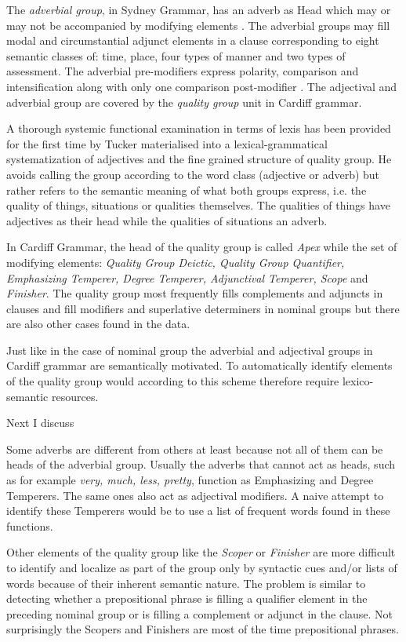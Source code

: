 	The \textit{adverbial group}, in Sydney Grammar, has an adverb as Head which may or may not be accompanied by modifying elements \citep[419]{Halliday2013}. The adverbial groups may fill modal and circumstantial adjunct elements in a clause corresponding to eight semantic classes of: time, place, four types of manner and two types of assessment. The adverbial pre-modifiers express polarity, comparison and intensification along with only one comparison post-modifier \citep[420--421]{Halliday2013}. The adjectival and adverbial group are covered by the \textit{quality group} unit in Cardiff grammar.
    
	A thorough systemic functional examination in terms of lexis has been provided for the first time by Tucker \citet{Tucker1997,Tucker1998} materialised into a lexical-grammatical systematization of adjectives and the fine grained structure of quality group. He avoids calling the group according to the word class (adjective or adverb) but rather refers to the semantic meaning of what both groups express, i.e. the quality of things, situations or qualities themselves. The qualities of things have adjectives as their head while the qualities of situations an adverb.       
	
	In Cardiff Grammar, the head of the quality group is called \textit{Apex} while the set of modifying elements: \textit{Quality Group Deictic, Quality Group Quantifier, Emphasizing Temperer, Degree Temperer, Adjunctival Temperer, Scope} and \textit{Finisher}. The quality group most frequently fills complements and adjuncts in clauses and fill modifiers and superlative determiners in nominal groups but there are also other cases found in the data. 
	
	Just like in the case of nominal group the adverbial and adjectival groups in Cardiff grammar are semantically motivated. To automatically identify elements of the quality group would according to this scheme therefore require lexico-semantic resources.
    
    Next I discuss 
    
    Some adverbs are different from others at least because not all of them can be heads of the adverbial group. Usually the adverbs that cannot act as heads, such as for example \textit{very, much, less, pretty}, function as Emphasizing and Degree Temperers. The same ones also act as adjectival modifiers. A naive attempt to identify these Temperers would be to use a list of frequent words found in these functions.
    
    Other elements of the quality group like the \textit{Scoper} or \textit{Finisher} are more difficult to identify and localize as part of the group only by syntactic cues and/or lists of words because of their inherent semantic nature. The problem is similar to detecting whether a prepositional phrase is filling a qualifier element in the preceding nominal group or is filling a complement or adjunct in the clause. Not surprisingly the Scopers and Finishers are most of the time prepositional phrases. 
	
